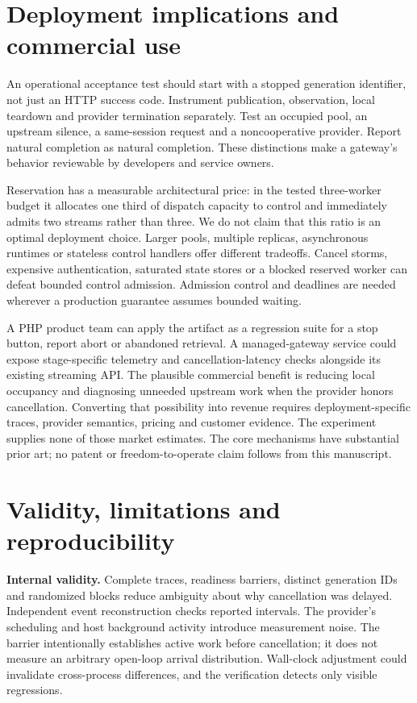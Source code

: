 \documentclass[11pt,a4paper]{article}
\begin{document}
\section{Deployment implications and commercial use}
An operational acceptance test should start with a stopped generation identifier, not just an HTTP success code. Instrument publication, observation, local teardown and provider termination separately. Test an occupied pool, an upstream silence, a same-session request and a noncooperative provider. Report natural completion as natural completion. These distinctions make a gateway's behavior reviewable by developers and service owners.

Reservation has a measurable architectural price: in the tested three-worker budget it allocates one third of dispatch capacity to control and immediately admits two streams rather than three. We do not claim that this ratio is an optimal deployment choice. Larger pools, multiple replicas, asynchronous runtimes or stateless control handlers offer different tradeoffs. Cancel storms, expensive authentication, saturated state stores or a blocked reserved worker can defeat bounded control admission. Admission control and deadlines are needed wherever a production guarantee assumes bounded waiting.

A PHP product team can apply the artifact as a regression suite for a stop button, report abort or abandoned retrieval. A managed-gateway service could expose stage-specific telemetry and cancellation-latency checks alongside its existing streaming API. The plausible commercial benefit is reducing local occupancy and diagnosing unneeded upstream work when the provider honors cancellation. Converting that possibility into revenue requires deployment-specific traces, provider semantics, pricing and customer evidence. The experiment supplies none of those market estimates. The core mechanisms have substantial prior art; no patent or freedom-to-operate claim follows from this manuscript.

\section{Validity, limitations and reproducibility}
\textbf{Internal validity.} Complete traces, readiness barriers, distinct generation IDs and randomized blocks reduce ambiguity about why cancellation was delayed. Independent event reconstruction checks reported intervals. The provider's scheduling and host background activity introduce measurement noise. The barrier intentionally establishes active work before cancellation; it does not measure an arbitrary open-loop arrival distribution. Wall-clock adjustment could invalidate cross-process differences, and the verification detects only visible regressions.
\end{document}

